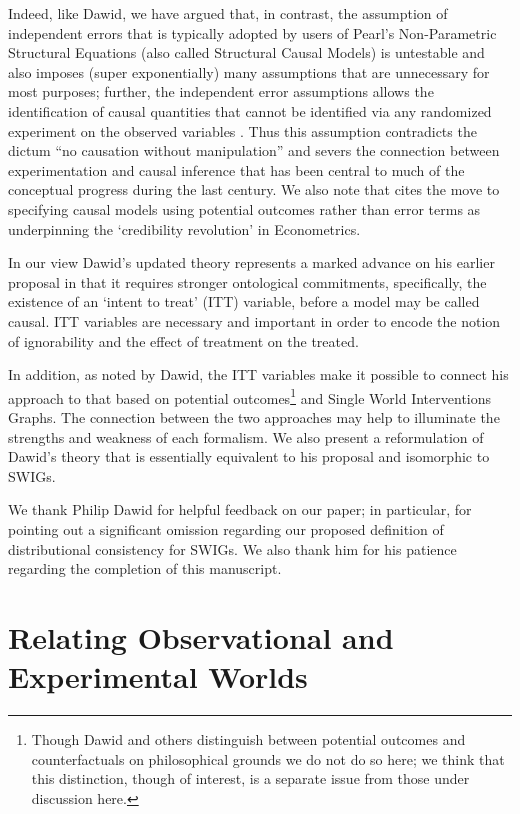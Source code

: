 \documentclass[11pt]{article}
\begin{document}
Indeed, like Dawid, we have argued that, in contrast, the assumption of independent errors that is typically adopted by users of Pearl's Non-Parametric Structural Equations (also called Structural Causal Models) is untestable and also imposes (super exponentially) many assumptions that are unnecessary for most purposes; further, the independent error assumptions allows the identification of causal quantities that cannot be identified via any randomized experiment on the observed variables \citep{robins10alternative}. Thus this assumption contradicts the dictum ``no causation without manipulation'' and severs the connection between experimentation and causal inference that has been central to much of the conceptual progress during the last century.
We also note that \citet{imbens:2022} cites the move to specifying causal models using 
potential outcomes rather than error terms as underpinning the `credibility revolution' in Econometrics.

In our view Dawid's updated theory represents a marked advance on his earlier proposal in that it requires stronger ontological commitments, specifically, the existence of an `intent to treat' (ITT) variable, before a model may be called causal. ITT variables are necessary and important in order to encode the notion of ignorability and the effect of treatment on the treated.

In addition, as noted by Dawid, the ITT variables make it possible to connect his approach to that based on potential outcomes\footnote{Though Dawid and others distinguish between potential outcomes and counterfactuals on philosophical grounds we do not do so here; we think that this distinction, though of interest, is a separate issue from those under discussion here.} and Single World Interventions Graphs. The connection between the two approaches may help to illuminate the strengths and weakness of each formalism.
We also present a reformulation of Dawid's theory that is essentially 
equivalent to his proposal and isomorphic to SWIGs.

We thank Philip Dawid for helpful feedback on our paper; in particular, for pointing out a significant omission regarding our proposed definition of distributional consistency for SWIGs. We also thank him for his patience regarding the completion of this manuscript.

\section{Relating Observational and Experimental Worlds}
\end{document}
